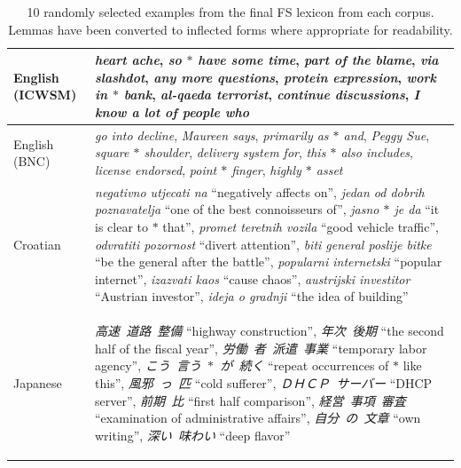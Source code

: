\documentclass[11pt,letterpaper]{article}
\newcommand{\gap}{$*$\xspace}
\newcommand{\ex}[1]{\textit{#1}\xspace}
\newcommand{\gl}[1]{``#1''\xspace}
\begin{document}
\begin{table}[!t]
 
 \begin{center}
 \begin{tabular}{p{1.5cm}p{14cm}}
\toprule
English (ICWSM) & \ex{heart ache}, \ex{so \gap have some time}, \ex{part of the blame}, \ex{via slashdot}, \ex{any more questions}, \ex{protein expression}, \ex{work in \gap bank}, \ex{al-qaeda terrorist}, \ex{continue discussions}, \ex{I know a lot of people who}\\
\midrule
English (BNC) & \ex{go into decline}, \ex{Maureen says}, \ex{primarily as \gap and}, \ex{Peggy Sue}, \ex{square \gap shoulder}, \ex{delivery system for}, \ex{this \gap also includes}, \ex{license endorsed}, \ex{point \gap finger}, \ex{highly \gap asset}\\
\midrule
Croatian & \ex{negativno utjecati na} \gl{negatively affects on},
\ex{jedan od dobrih poznavatelja} \gl{one of the best connoisseurs of}, \ex{jasno \gap je da} \gl{it is clear to \gap that}, \ex{promet teretnih vozila} \gl{good vehicle traffic}, \ex{odvratiti pozornost} \gl{divert attention}, \ex{biti general poslije bitke} \gl{be the general after the battle}, \ex{popularni internetski} \gl{popular internet}, \ex{izazvati kaos} \gl{cause chaos}, \ex{austrijski investitor} \gl{Austrian investor}, \ex{ideja o gradnji} \gl{the idea of building} \\
\midrule
Japanese & \begin{CJK*}{UTF8}{min} \ex{高速\ 道路\ 整備} \gl{highway construction}, \ex{年次\ 後期} \gl{the second half of the fiscal year}, \ex{労働\ 者\ 派遣\ 事業} \gl{temporary labor agency}, \ex{こう\ 言う\ \gap\ が\ 続く} \gl{repeat occurrences of \gap like this},  \ex{風邪\ っ\ 匹} \gl{cold sufferer}, \ex{ＤＨＣＰ\ サーバー} \gl{DHCP server}, \ex{前期\ 比} \gl{first half comparison}, \ex{経営\ 事項\ 審査 } \gl{examination of administrative affairs}, \ex{自分\ の\ 文章} \gl{own writing}, \ex{深い\ 味わい} \gl{deep flavor} \end{CJK*} \\
\bottomrule
\end{tabular}
  \caption{10 randomly selected examples from the final FS lexicon from each corpus. Lemmas have been converted to inflected forms where appropriate for readability.}
	 \label{tab:sample}

 \end{center}

\end{table}
\end{document}

